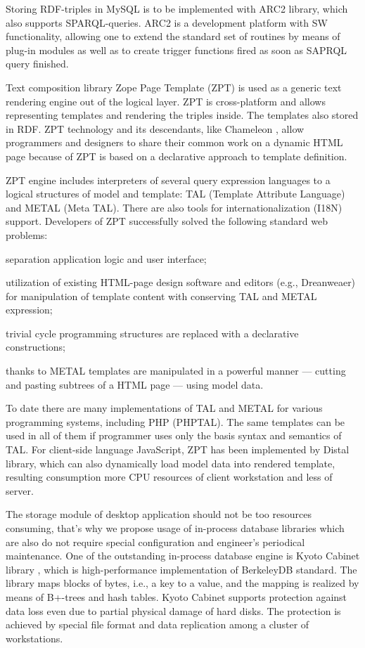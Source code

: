 \documentclass[conference]{IEEEtran}
\begin{document}
Storing RDF-triples in MySQL is to be implemented with ARC2 library,
which also supports SPARQL-queries.  ARC2 is a development platform
with SW functionality, allowing one to extend the standard set of
routines by means of plug-in modules as well as to create trigger
functions fired as soon as SAPRQL query finished.

Text composition library Zope Page Template (ZPT) \cite{zopetal} is used as a generic
text rendering engine out of the logical layer.  ZPT is cross-platform
and allows representing templates and rendering the triples inside.
The templates also stored in RDF.  ZPT technology and its descendants,
like Chameleon \cite{cham}, allow programmers and designers to share their common
work on a dynamic HTML page because of ZPT is based on a declarative
approach to template definition.

ZPT engine includes interpreters of several query expression languages
to a logical structures of model and template: TAL (Template Attribute
Language) and METAL (Meta TAL).  There are also tools for
internationalization (I18N) support.  Developers of ZPT successfully
solved the following standard web problems:
\begin{IEEEitemize}
\item separation application logic and user interface;
\item utilization of existing HTML-page design software and editors
  (e.g., Dreanweaer) for manipulation of template content with
  conserving TAL and METAL expression;
\item trivial cycle programming structures are replaced with a
  declarative constructions;
\item thanks to METAL templates are manipulated in a powerful manner
  --- cutting and pasting subtrees of a HTML page --- using model data.
\end{IEEEitemize}

To date there are many implementations of TAL and METAL for various
programming systems, including PHP (PHPTAL).  The same templates can
be used in all of them if programmer uses only the basis syntax and
semantics of TAL.  For client-side language JavaScript, ZPT has been
implemented by Distal library, which can also dynamically load model
data into rendered template, resulting consumption more CPU resources
of client workstation and less of server.

The storage module of desktop application should not be too
resources consuming, that's why we propose usage of in-process
database libraries which are also do not require special configuration
and engineer's periodical maintenance.  One of the outstanding
in-process database engine is Kyoto Cabinet library \cite{kiyoto},
which is high-performance implementation of BerkeleyDB standard.
The library maps blocks of bytes, i.e., a key to a value, and the
mapping is realized by means of B+-trees and hash tables.  Kyoto
Cabinet supports protection against data loss even due to partial
physical damage of hard disks.  The protection is achieved by special
file format and data replication among a cluster of workstations.
\end{document}
